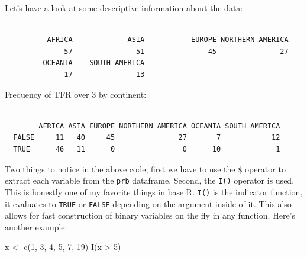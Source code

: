 \documentclass[
  letterpaper,
  DIV=11,
  numbers=noendperiod]{scrreprt}
\newenvironment{Shaded}{\begin{snugshade}}{\end{snugshade}}
\newcommand{\CommentTok}[1]{\textcolor[rgb]{0.37,0.37,0.37}{#1}}
\newcommand{\DecValTok}[1]{\textcolor[rgb]{0.68,0.00,0.00}{#1}}
\newcommand{\FunctionTok}[1]{\textcolor[rgb]{0.28,0.35,0.67}{#1}}
\newcommand{\NormalTok}[1]{\textcolor[rgb]{0.00,0.23,0.31}{#1}}
\newcommand{\OtherTok}[1]{\textcolor[rgb]{0.00,0.23,0.31}{#1}}
\newcommand{\SpecialCharTok}[1]{\textcolor[rgb]{0.37,0.37,0.37}{#1}}
\begin{document}
Let's have a look at some descriptive information about the data:

\begin{Shaded}
\end{Shaded}

\begin{verbatim}

          AFRICA             ASIA           EUROPE NORTHERN AMERICA 
              57               51               45               27 
         OCEANIA    SOUTH AMERICA 
              17               13 
\end{verbatim}

Frequency of TFR over 3 by continent:

\begin{Shaded}
\end{Shaded}

\begin{verbatim}
       
        AFRICA ASIA EUROPE NORTHERN AMERICA OCEANIA SOUTH AMERICA
  FALSE     11   40     45               27       7            12
  TRUE      46   11      0                0      10             1
\end{verbatim}

Two things to notice in the above code, first we have to use the
\texttt{\$} operator to extract each variable from the \texttt{prb}
dataframe. Second, the \texttt{I()} operator is used. This is honestly
one of my favorite things in base R. \texttt{I()} is the indicator
function, it evaluates to \texttt{TRUE} or \texttt{FALSE} depending on
the argument inside of it. This also allows for fast construction of
binary variables on the fly in any function. Here's another example:

\begin{Shaded}
\begin{Highlighting}[]
\NormalTok{x }\OtherTok{\textless{}{-}} \FunctionTok{c}\NormalTok{(}\DecValTok{1}\NormalTok{, }\DecValTok{3}\NormalTok{, }\DecValTok{4}\NormalTok{, }\DecValTok{5}\NormalTok{, }\DecValTok{7}\NormalTok{, }\DecValTok{19}\NormalTok{)}
\FunctionTok{I}\NormalTok{(x }\SpecialCharTok{\textgreater{}} \DecValTok{5}\NormalTok{)}
\end{Highlighting}
\end{Shaded}
\end{document}
